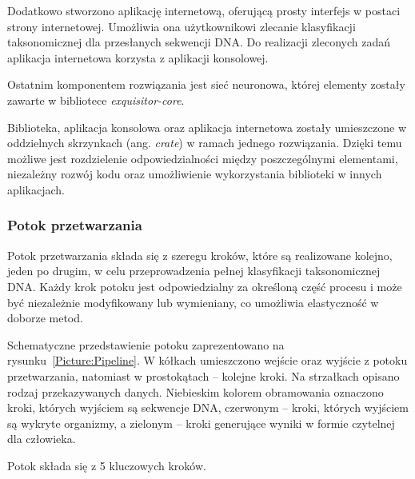         Dodatkowo stworzono aplikację internetową, oferującą prosty interfejs w postaci strony internetowej. Umożliwia ona użytkownikowi zlecanie klasyfikacji taksonomicznej dla przesłanych sekwencji DNA. Do realizacji zleconych zadań aplikacja internetowa korzysta z aplikacji konsolowej.

        Ostatnim komponentem rozwiązania jest sieć neuronowa, której elementy zostały zawarte w bibliotece \textit{exquisitor-core}.

        Biblioteka, aplikacja konsolowa oraz aplikacja internetowa zostały umieszczone w oddzielnych skrzynkach (ang. \textit{crate}) w ramach jednego rozwiązania. Dzięki temu możliwe jest rozdzielenie odpowiedzialności między poszczególnymi elementami, niezależny rozwój kodu oraz umożliwienie wykorzystania biblioteki w innych aplikacjach.


        \subsubsection{Potok przetwarzania}

            Potok przetwarzania składa się z szeregu kroków, które są realizowane kolejno, jeden po drugim, w celu przeprowadzenia pełnej klasyfikacji taksonomicznej DNA. Każdy krok potoku jest odpowiedzialny za określoną część procesu i może być niezależnie modyfikowany lub wymieniany, co umożliwia elastyczność w doborze metod.

            Schematyczne przedstawienie potoku zaprezentowano na rysunku~\ref{Picture:Pipeline}. W kółkach umieszczono wejście oraz wyjście z potoku przetwarzania, natomiast w prostokątach – kolejne kroki. Na strzałkach opisano rodzaj przekazywanych danych. Niebieskim kolorem obramowania oznaczono kroki, których wyjściem są sekwencje DNA, czerwonym – kroki, których wyjściem są wykryte organizmy, a zielonym – kroki generujące wyniki w formie czytelnej dla człowieka.

            Potok składa się z 5 kluczowych kroków.

